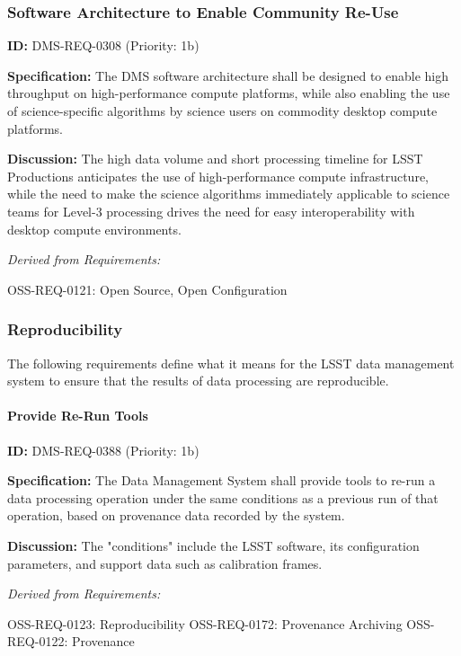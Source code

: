 \documentclass[SE,toc,lsstdraft]{lsstdoc}
\begin{document}
\subsubsection{Software Architecture to Enable Community Re-Use}

\label{DMS-REQ-0308}
\textbf{ID:} DMS-REQ-0308 (Priority: 1b)

\textbf{Specification:}
The DMS software architecture shall be designed to enable high throughput on high-performance compute platforms, while also enabling the use of science-specific algorithms by science users on commodity desktop compute platforms.

\textbf{Discussion:}
The high data volume and short processing timeline for LSST Productions anticipates the use of high-performance compute infrastructure, while the need to make the science algorithms immediately applicable to science teams for Level-3 processing drives the need for easy interoperability with desktop compute environments.

\emph{Derived from Requirements:}

OSS-REQ-0121:
Open Source, Open Configuration \newline

\subsubsection{Reproducibility}

The following requirements define what it means for the LSST data management system to ensure that the results of data processing are reproducible.

\paragraph{Provide Re-Run Tools}\hfill  %

\label{DMS-REQ-0388}
\textbf{ID:} DMS-REQ-0388 (Priority: 1b)

\textbf{Specification:}
The Data Management System shall provide tools to re-run a data processing operation under the same conditions as a previous run of that operation, based on provenance data recorded by the system.

\textbf{Discussion:}
The "conditions" include the LSST software, its configuration parameters, and support data such as calibration frames.

\emph{Derived from Requirements:}

OSS-REQ-0123:
Reproducibility \newline
OSS-REQ-0172:
Provenance Archiving \newline
OSS-REQ-0122:
Provenance \newline
\end{document}
